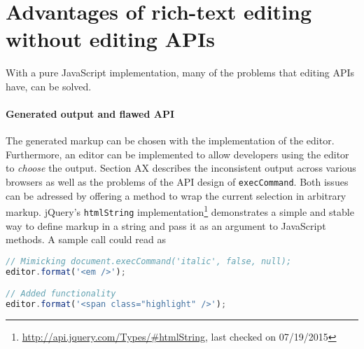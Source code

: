 



\section{Advantages of rich-text editing without editing APIs}

With a pure JavaScript implementation, many of the problems that editing APIs have, can be solved.

\paragraph{Generated output and flawed API} The generated markup can be chosen with the implementation of the editor. Furthermore, an editor can be implemented to allow developers using the editor to \textit{choose} the output. Section AX describes the inconsistent output across various browsers as well as the problems of the API design of \texttt{execCommand}. Both issues can be adressed by offering a method to wrap the current selection in arbitrary markup. jQuery's \texttt{htmlString} implementation\footnote{\url{http://api.jquery.com/Types/\#htmlString}, last checked on 07/19/2015} demonstrates a simple and stable way to define markup in a string and pass it as an argument to JavaScript methods. A sample call could read as

\begin{lstlisting}[language=JavaScript, caption=Example calls to format text, label=lst:format-examples]
// Mimicking document.execCommand('italic', false, null);
editor.format('<em />');

// Added functionality
editor.format('<span class="highlight" />');
\end{lstlisting}

